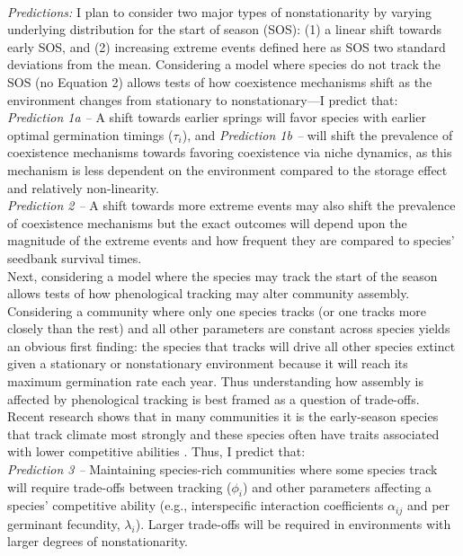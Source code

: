 \documentclass[12pt,a4paper,oneside]{article}
\begin{document}
\vspace{1.5ex}\\
\emph{Predictions:} 
I plan to consider two major types of nonstationarity by varying underlying distribution for the start of season (SOS): (1) a linear shift towards early SOS, and (2) increasing extreme events defined here as SOS two standard deviations from the mean. Considering a model where species do not track the SOS (no Equation 2) allows tests of how coexistence mechanisms shift as the environment changes from stationary to nonstationary---I predict that:\\
\emph{Prediction 1a --} A shift towards earlier springs will favor species with earlier optimal germination timings ($\tau_i$), and \emph{Prediction 1b --} will shift the prevalence of coexistence mechanisms towards favoring coexistence via niche dynamics, as this mechanism is less dependent on the environment compared to the storage effect and relatively non-linearity.\\
\emph{Prediction 2 --} A shift towards more extreme events may also shift the prevalence of coexistence mechanisms but the exact outcomes will depend upon the magnitude of the extreme events and how frequent they are compared to species' seedbank survival times.
\vspace{1.5ex}\\
Next, considering a model where the species may track the start of the season allows tests of how phenological tracking may alter community assembly. Considering a community where only one species tracks (or one tracks more closely than the rest) and all other parameters are constant across species yields an obvious first finding: the species that tracks will drive all other species extinct given a stationary or nonstationary environment because it will reach its maximum germination rate each year. Thus understanding how assembly is affected by phenological tracking is best framed as a question of trade-offs. Recent research shows that in many communities it is the early-season species that track climate most strongly \citep{Cook:2012} and these species often have traits associated with lower competitive abilities \citep{wolkovich2014aob}. Thus, I predict that:\\
\emph{Prediction 3 --} Maintaining species-rich communities where some species track will require trade-offs between tracking ($\phi_i$) and other parameters affecting a species' competitive ability (e.g., interspecific interaction coefficients $\alpha_{ij}$ and per germinant fecundity, $\lambda_i$). Larger trade-offs will be required in environments with larger degrees of nonstationarity. 
\end{document}
